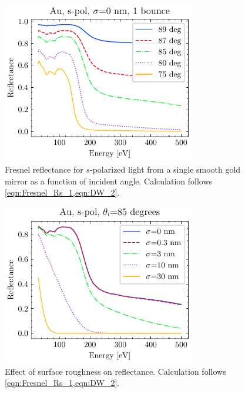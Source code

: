 \begin{figure}
	\centering
	\includegraphics[width=0.75\textwidth]{figures/chap2/Au_ReflvsAngle.pdf}
	\caption{Fresnel reflectance for $s$-polarized light from a single smooth gold mirror as a function of incident angle. Calculation follows \cref{eqn:Fresnel_Rs_1,eqn:DW_2}.}
	\label{fig:Au_ReflvsAngle}
\end{figure}

\begin{figure}
	\centering
	\includegraphics[width=0.75\textwidth]{figures/chap2/R_vs_roughness.pdf}
	\caption{Effect of surface roughness on reflectance. Calculation follows \cref{eqn:Fresnel_Rs_1,eqn:DW_2}.}
	\label{fig:R_vs_roughness}
\end{figure}

